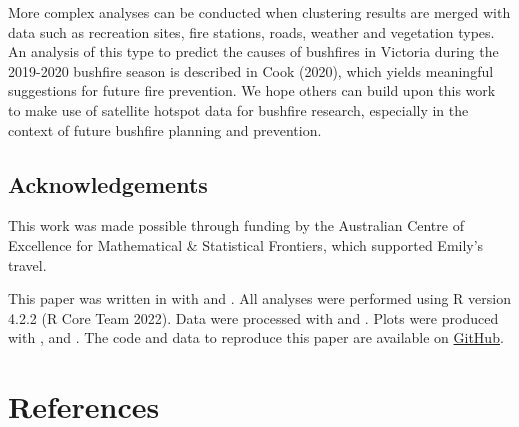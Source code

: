 More complex analyses can be conducted when clustering results are merged with data such as recreation sites, fire stations, roads, weather and vegetation types. An analysis of this type to predict the causes of bushfires in Victoria during the 2019-2020 bushfire season is described in Cook (2020), which yields meaningful suggestions for future fire prevention. We hope others can build upon this work to make use of satellite hotspot data for bushfire research, especially in the context of future bushfire planning and prevention.

\hypertarget{acknowledgements}{%
\subsection{Acknowledgements}\label{acknowledgements}}

This work was made possible through funding by the Australian Centre of Excellence for Mathematical \& Statistical Frontiers, which supported Emily's travel.

This paper was written in  with  and . All analyses were performed using R version 4.2.2 (R Core Team 2022). Data were processed with  and . Plots were produced with ,  and . The code and data to reproduce this paper are available on \href{https://github.com/TengMCing/Hotspots-Clustering-Algorithm}{GitHub}.

\hypertarget{references}{%
\section*{References}\label{references}}

